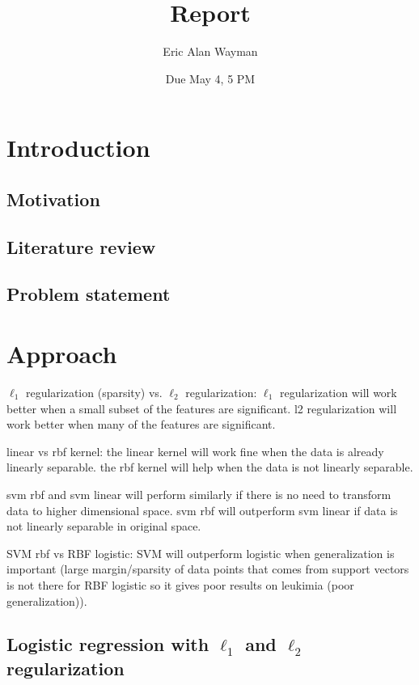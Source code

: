 \documentclass[letterpaper, 12pt]{article}
\begin{document}
\renewcommand{\arraystretch}{1.1}

\title{Report}
\author{Eric Alan Wayman}
\date{Due May 4, 5 PM}
\maketitle

\section{Introduction}

\subsection{Motivation}

\subsection{Literature review}

\subsection{Problem statement}

\section{Approach}

$\ell_1$ regularization (sparsity) vs. $\ell_2$ regularization: $\ell_1$ regularization will work better when a small subset of the features are significant. l2 regularization will work better when many of the features are significant.

linear vs rbf kernel: the linear kernel will work fine when the data is already linearly separable. the rbf kernel will help when the data is not linearly separable.

svm rbf and svm linear will perform similarly if there is no need to transform data to higher dimensional space. svm rbf will outperform svm linear if data is not linearly separable in original space.

SVM rbf vs RBF logistic: SVM will outperform logistic when generalization is important (large margin/sparsity of data points that comes from support vectors is not there for RBF logistic so it gives poor results on leukimia (poor generalization)).

\subsection{Logistic regression with $\ell_1$ and $\ell_2$ regularization}
\end{document}

